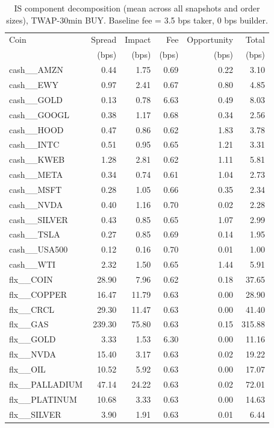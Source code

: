 \begin{table}[h]
\centering
\caption{IS component decomposition (mean across all snapshots and order sizes), TWAP-30min BUY. Baseline fee = 3.5 bps taker, 0 bps builder.}
\label{tab:is_decomposition}
\begin{tabular}{lrrrrr}
\toprule
Coin & Spread & Impact & Fee & Opportunity & Total \\
 & (bps) & (bps) & (bps) & (bps) & (bps) \\
\midrule
cash__AMZN & 0.44 & 1.75 & 0.69 & 0.22 & 3.10 \\
cash__EWY & 0.97 & 2.41 & 0.67 & 0.80 & 4.85 \\
cash__GOLD & 0.13 & 0.78 & 6.63 & 0.49 & 8.03 \\
cash__GOOGL & 0.38 & 1.17 & 0.68 & 0.34 & 2.56 \\
cash__HOOD & 0.47 & 0.86 & 0.62 & 1.83 & 3.78 \\
cash__INTC & 0.51 & 0.95 & 0.65 & 1.21 & 3.31 \\
cash__KWEB & 1.28 & 2.81 & 0.62 & 1.11 & 5.81 \\
cash__META & 0.34 & 0.74 & 0.61 & 1.04 & 2.73 \\
cash__MSFT & 0.28 & 1.05 & 0.66 & 0.35 & 2.34 \\
cash__NVDA & 0.40 & 1.16 & 0.70 & 0.02 & 2.28 \\
cash__SILVER & 0.43 & 0.85 & 0.65 & 1.07 & 2.99 \\
cash__TSLA & 0.27 & 0.85 & 0.69 & 0.14 & 1.95 \\
cash__USA500 & 0.12 & 0.16 & 0.70 & 0.01 & 1.00 \\
cash__WTI & 2.32 & 1.50 & 0.65 & 1.44 & 5.91 \\
flx__COIN & 28.90 & 7.96 & 0.62 & 0.18 & 37.65 \\
flx__COPPER & 16.47 & 11.79 & 0.63 & 0.00 & 28.90 \\
flx__CRCL & 29.30 & 11.47 & 0.63 & 0.00 & 41.40 \\
flx__GAS & 239.30 & 75.80 & 0.63 & 0.15 & 315.88 \\
flx__GOLD & 3.33 & 1.53 & 6.30 & 0.00 & 11.16 \\
flx__NVDA & 15.40 & 3.17 & 0.63 & 0.02 & 19.22 \\
flx__OIL & 10.52 & 5.92 & 0.63 & 0.00 & 17.07 \\
flx__PALLADIUM & 47.14 & 24.22 & 0.63 & 0.02 & 72.01 \\
flx__PLATINUM & 10.68 & 3.33 & 0.63 & 0.00 & 14.63 \\
flx__SILVER & 3.90 & 1.91 & 0.63 & 0.01 & 6.44 \\

\end{tabular}
\end{table}
